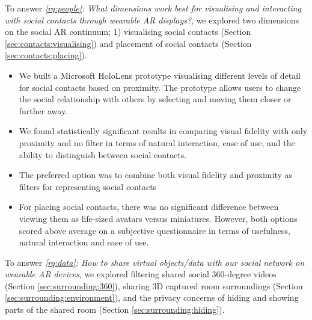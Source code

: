 To answer \textit{\ref{rq:people}: What dimensions work best for visualising and interacting with social contacts through wearable AR displays?}, we explored two dimensions on the social AR continuum; 1) visualising social contacts (Section \ref{sec:contacts:visualising}) and placement of social contacts (Section \ref{sec:contacts:placing}). 

\begin{itemize}
    \item{We built a Microsoft HoloLens prototype visualising different levels of detail for social contacts based on proximity. The prototype allows users to change the social relationship with others by selecting and moving them closer or further away.}
    \item{We found statistically significant results in comparing visual fidelity with only proximity and no filter in terms of natural interaction, ease of use, and the ability to distinguish between social contacts.}
    \item{The preferred option was to combine both visual fidelity and proximity as filters for representing social contacts}
    \item{For placing social contacts, there was no significant difference between viewing them as life-sized avatars versus miniatures. However, both options scored above average on a subjective questionnaire in terms of usefulness, natural interaction and ease of use.}
\end{itemize}

To answer \textit{\ref{rq:data}: How to share virtual objects/data with our social network on wearable AR devices}, we explored filtering shared social 360-degree videos (Section \ref{sec:surrounding:360}), sharing 3D captured room surroundings (Section \ref{sec:surrounding:environment}), and the privacy concerns of hiding and showing parts of the shared room (Section \ref{sec:surrounding:hiding}). 

